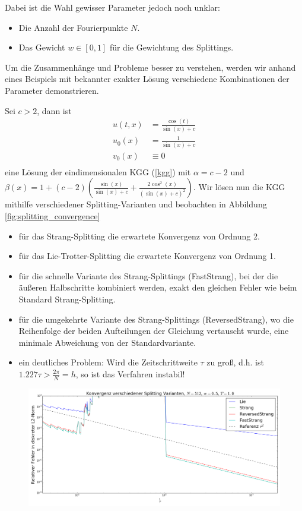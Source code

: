 Dabei ist die Wahl gewisser Parameter jedoch noch unklar:
\begin{itemize}
\item Die Anzahl der Fourierpunkte $N$.
\item Das Gewicht $w\in[0,1]$ für die Gewichtung des Splittings. 
\end{itemize}
Um die Zusammenhänge und Probleme besser zu verstehen, werden wir anhand eines Beispiels mit bekannter exakter Lösung verschiedene Kombinationen der Parameter demonstrieren.
\begin{mathbsp}
\label{bsp:trialfrog2}
Sei $c>2$, dann ist
\begin{align*}
u(t,x)&=\frac{\cos(t)}{\sin(x)+c}\\
u_0(x)&=\frac{1}{\sin(x)+c}\\
v_0(x)&\equiv 0\\
\end{align*}
eine Lösung der eindimensionalen KGG (\ref{kgg}) mit $\alpha=c-2$ und $\beta(x)=1+(c-2)\left(\frac{\sin(x)}{\sin(x)+c}+\frac{2\cos^2(x)}{(\sin(x)+c)^2}\right)$. Wir lösen nun die KGG mithilfe verschiedener Splitting-Varianten und beobachten in Abbildung \ref{fig:splitting_convergence}
\begin{itemize}
\item für das Strang-Splitting die erwartete Konvergenz von Ordnung 2.
\item für das Lie-Trotter-Splitting die erwartete Konvergenz von Ordnung 1.
\item für die schnelle Variante des Strang-Splittings (FastStrang), bei der die äußeren Halbschritte kombiniert werden, exakt den gleichen Fehler wie beim Standard Strang-Splitting.
\item für die umgekehrte Variante des Strang-Splittings (ReversedStrang), wo die Reihenfolge der beiden Aufteilungen der Gleichung vertauscht wurde, eine minimale Abweichung von der Standardvariante.
\item ein deutliches Problem: Wird die Zeitschrittweite $\tau$ zu groß, d.h. ist $1.227\tau>\frac{2\pi}{N}=h$, so ist das Verfahren instabil!
\end{itemize}
\begin{figure}[!htb]
\includegraphics[width=\textwidth]{Figures/splitting_convergence_fix_weight_frog2_cfl.png}

\end{figure}
\end{mathbsp}
